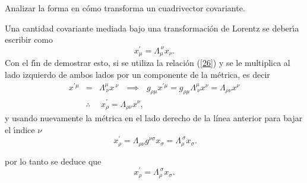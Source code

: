 \begin{exercise}
Analizar la forma en cómo transforma un cuadrivector covariante.
\end{exercise}
\begin{solution}
Una cantidad covariante mediada bajo una transformaci\'{o}n de Lorentz se
deber\'{\i}a escribir como
\begin{equation}
x_{\mu}^{\prime}=\Lambda _{\mu}^{~\nu}x_{\nu}   \label{29}.
\end{equation}
Con el f\'{\i}n de demostrar esto, si se utiliza la relaci\'{o}n (\ref{26})
y se le multiplica al lado izquierdo de ambos lados por un componente de la m\'{e}trica, 
es decir
\begin{eqnarray*}
x^{\prime \mu } &=&\Lambda_{~\nu}^{\mu}x^{~\nu}~\ \ \implies ~\ \ g_{\rho
\mu }x^{\prime \mu }=g_{\rho \mu }\Lambda _{~\nu}^{\mu}x^{\nu}=\Lambda
_{\rho \nu }x^{\nu } \\
&\therefore &~x_{\rho }^{\prime }=\Lambda_{\rho \nu }x^{\nu },
\end{eqnarray*}
y usando nuevamente la m\'{e}trica en el lado derecho de la línea anterior
para bajar el \'{\i}ndice $\nu $
\begin{equation*}
~x_{\rho }^{\prime}=\Lambda_{\rho \nu}g^{\nu \sigma}x_{\sigma}=\Lambda_{\rho}^{~\sigma}x_{\sigma }.
\end{equation*}

por lo tanto se deduce que
\begin{equation}
x_{\rho }^{\prime }=\Lambda _{\rho }^{~\sigma }x_{\sigma }  \label{29b}.
\end{equation}

\end{solution}

